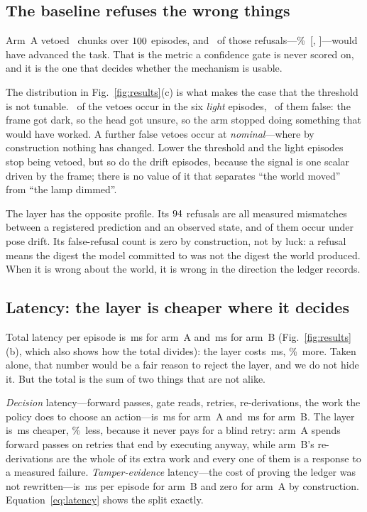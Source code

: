 \documentclass[conference]{IEEEtran}
\theoremstyle{definition}
\begin{document}
\subsection{The baseline refuses the wrong things}

Arm~A vetoed \SafeVetoes\ chunks over $100$ episodes, and
\SafeFalseVetoes\ of those refusals---\SafeFalseVetoRate\%\ [\SafeFalseVetoLo,
\SafeFalseVetoHi]---would have advanced the task. That is the metric a
confidence gate is never scored on, and it is the one that decides whether the
mechanism is usable.

The distribution in Fig.~\ref{fig:results}(c) is what makes the case that the
threshold is not tunable.
\SafeVetoesLightDim\ of the \SafeVetoes{} vetoes occur in the six
\emph{light} episodes, \SafeFalseVetoesLightDim\ of them false: the frame got
dark, so the head got unsure, so the arm stopped doing something that would
have worked. A further \SafeFalseVetoesNominal{} false vetoes occur at
\emph{nominal}---where by construction nothing has changed. Lower the threshold
and the light episodes stop being vetoed, but so do the drift episodes, because
the signal is one scalar driven by the frame; there is no value of it that
separates ``the world moved'' from ``the lamp dimmed''.

The layer has the opposite profile. Its $94$ refusals are all
measured mismatches between a registered prediction and an observed state, and
\CELRefusalsPose{} of them occur under pose drift. Its false-refusal count is
zero by construction, not by luck: a refusal means the digest the model
committed to was not the digest the world produced. When it is wrong about the
world, it is wrong in the direction the ledger records.

\subsection{Latency: the layer is cheaper where it decides}
\label{sec:latency}

Total latency per episode is \SafeLatency\,ms for arm~A and \CELLatency\,ms for
arm~B (Fig.~\ref{fig:results}(b), which also shows how the total divides): the
layer costs \LatencyDelta\,ms, \LatencyDeltaPct\%\ more. Taken
alone, that number would be a fair reason to reject the layer, and we do not
hide it. But the total is the sum of two things that are not alike.

\emph{Decision} latency---forward passes, gate reads, retries, re-derivations,
the work the policy does to choose an action---is \SafeLatency\,ms for arm~A and
\CELDecisionLatency\,ms for arm~B. The layer is \DecisionSaving\,ms
cheaper, \DecisionSavingPct\%\ less, because it never pays for a blind retry:
arm~A spends \SafeRetries{} forward passes on retries that end by executing
anyway, while arm~B's \CELReplans{} re-derivations are the whole of its extra
work and every one of them is a response to a measured failure.
\emph{Tamper-evidence} latency---the cost of proving the ledger was not
rewritten---is \CELWitnessLatency\,ms per episode for arm~B and zero for arm~A
by construction. Equation~\eqref{eq:latency} shows the split exactly.
\end{document}
